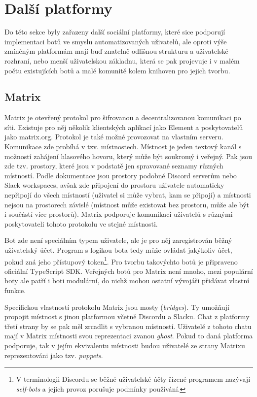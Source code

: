 \documentclass[FM]{tulthesis}
\begin{document}
	\section{Další platformy}
	
	Do této sekce byly zařazeny další sociální platformy, které sice podporují implementaci botů ve smyslu automatizovaných uživatelů, ale oproti výše zmíněným platformám mají buď znatelně odlišnou strukturu a uživatelské rozhraní, nebo menší uživatelskou základnu, která se pak projevuje i v malém počtu existujících botů a malé komunitě kolem knihoven pro jejich tvorbu.
	
	\subsection{Matrix}
	
	Matrix je otevřený protokol pro šifrovanou a decentralizovanou komunikaci po síti. Existuje pro něj několik klientských aplikací jako Element a poskytovatelů jako matrix.org. Protokol je také možné provozovat na vlastním serveru. Komunikace zde probíhá v tzv. místnostech. Místnost je jeden textový kanál s možností zahájení hlasového hovoru, který může být soukromý i veřejný. Pak jsou zde tzv. prostory, které jsou v podstatě jen spravované seznamy různých místností. Podle dokumentace jsou prostory podobné Discord serverům nebo Slack workspaces, avšak zde připojení do prostoru uživatele automaticky nepřipojí do všech místností (uživatel si může vybrat, kam se připojí) a místnosti nejsou na prostorech závislé (místnost může existovat bez prostoru, může ale být i součástí více prostorů). Matrix podporuje komunikaci uživatelů s různými poskytovateli tohoto protokolu ve stejné místnosti.
	
	Bot zde není speciálním typem uživatele, ale je pro něj zaregistrován běžný uživatelský účet. Program s logikou bota tedy může ovládat jakýkoliv účet, pokud zná jeho přístupový token\footnote{V terminologii Discordu se běžné uživatelské účty řízené programem nazývají \textit{self-bots} a jejich provoz porušuje podmínky používání.}. Pro tvorbu takovýchto botů je připraveno oficiální \mbox{TypeScript} SDK. Veřejných botů pro Matrix není mnoho, mezi populární boty ale patří i boti modulární, do nichž mohou ostatní vývojáři přidávat vlastní funkce.
	
	Specifickou vlastností protokolu Matrix jsou mosty (\textit{bridges}). Ty umožňují propojit místnost s jinou platformou včetně Discordu a Slacku. Chat z platformy třetí strany by se pak měl zrcadlit s vybranou místností. Uživatelé z tohoto chatu \mbox{mají} v Matrix místnosti svou reprezentaci zvanou \textit{ghost}. Pokud to daná platforma podporuje, tak v jejím ekvivalentu místnosti budou uživatelé ze strany Matrixu reprezentováni jako tzv. \textit{puppets}. \cite{doc_Matrix}
	
\end{document}

